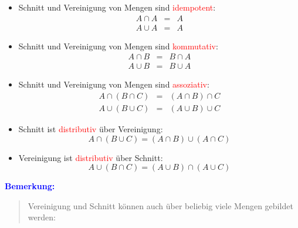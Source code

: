 \documentclass{article}
\newcommand{\blue}[1]{\textcolor{blue}{#1}}
\newcommand{\an}[1]{\blue{\textbf{Bemerkung: }}\begin{quote}#1\end{quote}}
\begin{document}
\begin{itemize}
    \item Schnitt und Vereinigung von Mengen sind \textcolor{red}{idempotent}:
    \begin{equation*}
        \begin{array}{lcl}
            A \cap A & = & A\\
            A \cup A & = & A
        \end{array}
    \end{equation*}
    \item Schnitt und Vereinigung von Mengen sind \textcolor{red}{kommutativ}:
    \begin{equation*}
        \begin{array}{lcl}
            A \cap B & = & B \cap A\\
            A \cup B & = & B \cup A
        \end{array}
    \end{equation*}
    \item Schnitt und Vereinigung von Mengen sind \textcolor{red}{assoziativ}:
    \begin{equation*}
        \begin{array}{lcl}
            A \cap (B \cap C) & = & (A \cap B) \cap C\\
            A \cup (B \cup C) & = & (A \cup B) \cup C
        \end{array}
    \end{equation*}
    \item Schnitt ist \textcolor{red}{distributiv} über Vereinigung:
    \begin{equation*}
        A \cap (B \cup C) = (A \cap B) \cup (A \cap C)
    \end{equation*}
    \item Vereinigung ist \textcolor{red}{distributiv} über Schnitt:
    \begin{equation*}
        A \cup (B \cap C) = (A \cup B) \cap (A \cup C)
    \end{equation*}
\end{itemize}

\an{Vereinigung und Schnitt können auch über beliebig viele Mengen gebildet werden:}
\end{document}
